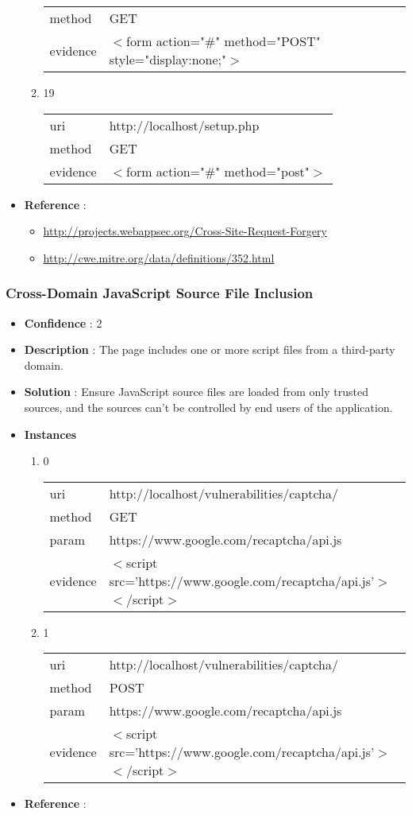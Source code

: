 \documentclass[10pt]{article}
\begin{document}
\begin{itemize}
\begin{enumerate}
\begin{tabular}{| l | p{12cm}}
method & GET \\
evidence & $<$form action="\#" method="POST" style="display:none;"$>$ \\
\end{tabular}
\item[] 19
\begin{tabular}{| l | p{12cm}}
uri & http://localhost/setup.php \\
method & GET \\
evidence & $<$form action="\#" method="post"$>$ \\
\end{tabular}
\end{enumerate}
\item[] \textbf{Reference} : 
\begin{itemize}
\item \url{http://projects.webappsec.org/Cross-Site-Request-Forgery}
\item \url{http://cwe.mitre.org/data/definitions/352.html}
\end{itemize}
\end{itemize}
\subsubsection{Cross-Domain JavaScript Source File Inclusion}
\begin{itemize}
\item[] \textbf{Confidence} : 2
\item[] \textbf{Description} : The page includes one or more script files from a third-party domain.
\item[] \textbf{Solution} :  Ensure JavaScript source files are loaded from only trusted sources, and the sources can't be controlled by end users of the application.
\item[] \textbf{Instances}
\begin{enumerate}
\item[] 0
\begin{tabular}{| l | p{12cm}}
uri & http://localhost/vulnerabilities/captcha/ \\
method & GET \\
param & https://www.google.com/recaptcha/api.js \\
evidence & $<$script src='https://www.google.com/recaptcha/api.js'$>$$<$/script$>$ \\
\end{tabular}
\item[] 1
\begin{tabular}{| l | p{12cm}}
uri & http://localhost/vulnerabilities/captcha/ \\
method & POST \\
param & https://www.google.com/recaptcha/api.js \\
evidence & $<$script src='https://www.google.com/recaptcha/api.js'$>$$<$/script$>$ \\
\end{tabular}
\end{enumerate}
\item[] \textbf{Reference} : 
\end{itemize}
\end{document}
